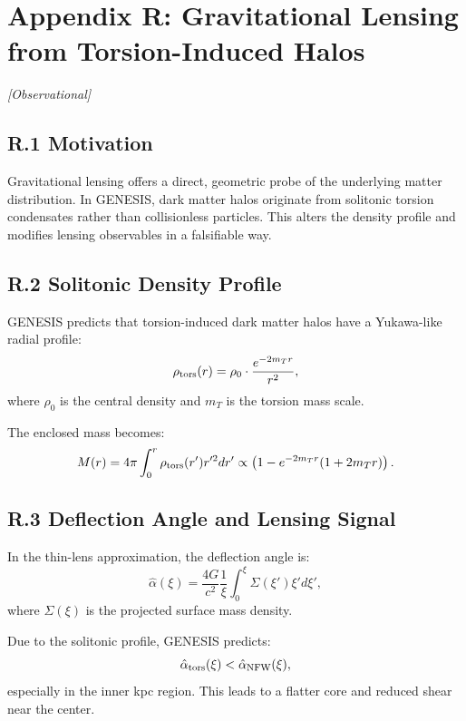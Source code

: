 \documentclass{article}
\newcommand{\obstag}{\textcolor{green!60!black}{\textit{[Observational]}}}
\begin{document}
\section*{Appendix R: Gravitational Lensing from Torsion-Induced Halos}
\label{app:lensing}
\obstag  


\subsection*{R.1 Motivation}
Gravitational lensing offers a direct, geometric probe of the underlying matter distribution. In GENESIS, dark matter halos originate from solitonic torsion condensates rather than collisionless particles. This alters the density profile and modifies lensing observables in a falsifiable way.

\subsection*{R.2 Solitonic Density Profile}
GENESIS predicts that torsion-induced dark matter halos have a Yukawa-like radial profile:
\begin{equation}
\rho_{\rm tors}(r) = \rho_0 \cdot \frac{e^{-2 m_T r}}{r^2},
\end{equation}
where \( \rho_0 \) is the central density and \( m_T \) is the torsion mass scale.

The enclosed mass becomes:
\begin{equation}
M(r) = 4\pi \int_0^r \rho_{\rm tors}(r') r'^2 dr' \propto \left(1 - e^{-2 m_T r}(1 + 2 m_T r)\right).
\end{equation}

\subsection*{R.3 Deflection Angle and Lensing Signal}
In the thin-lens approximation, the deflection angle is:
\begin{equation}
\hat{\alpha}(\xi) = \frac{4G}{c^2} \frac{1}{\xi} \int_0^\xi \Sigma(\xi') \xi' d\xi',
\end{equation}
where \( \Sigma(\xi) \) is the projected surface mass density.

Due to the solitonic profile, GENESIS predicts:
\begin{equation}
\hat{\alpha}_{\rm tors}(\xi) < \hat{\alpha}_{\rm NFW}(\xi),
\end{equation}
especially in the inner kpc region. This leads to a flatter core and reduced shear near the center.
\end{document}
